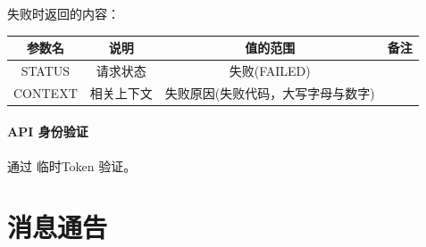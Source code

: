 \documentclass[UTF8]{article}
\def\apiauth{\paragraph{\colorbox[rgb]{0.45,0.9,1}{API 身份验证}}} %
\def\失败{\colorbox[rgb]{1,0.5,0.5}{失败}}
\def\失败V{失败(FAILED)}
\def\失败原因{失败原因(失败代码，大写字母与数字)}
\begin{document}
    \par \失败 时返回的内容：\\
    \begin{tabular}{|c|c|c|c|}
        \hline \rule[-2ex]{0pt}{5.5ex} 参数名 & 说明 & 值的范围 & 备注 \\
        \hline \rule[-2ex]{0pt}{5.5ex} STATUS & 请求状态 & \失败V &  \\ 
        \hline \rule[-2ex]{0pt}{5.5ex} CONTEXT & 相关上下文 & \失败原因 &  \\
        \hline 
    \end{tabular}
    \apiauth
    通过 临时Token 验证。
    \section{消息通告}
\end{document}
